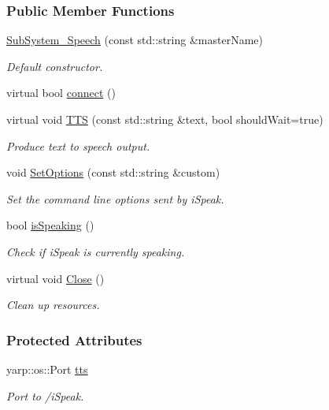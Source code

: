 \subsubsection*{Public Member Functions}
\begin{DoxyCompactItemize}
\item 
\hyperlink{group__icubclient__subsystems_a5a699b6d31d50fec18e5e63adecf5c96}{Sub\+System\+\_\+\+Speech} (const std\+::string \&master\+Name)
\begin{DoxyCompactList}\small\item\em Default constructor. \end{DoxyCompactList}\item 
virtual bool \hyperlink{group__icubclient__subsystems_abbf3a0069184f64f4999b0e94077b2db}{connect} ()
\item 
virtual void \hyperlink{group__icubclient__subsystems_aec30b053cc477248ac8c50e8b8d16c38}{T\+TS} (const std\+::string \&text, bool should\+Wait=true)
\begin{DoxyCompactList}\small\item\em Produce text to speech output. \end{DoxyCompactList}\item 
void \hyperlink{group__icubclient__subsystems_ae6d315e4436bdd157dd6427fa7274999}{Set\+Options} (const std\+::string \&custom)
\begin{DoxyCompactList}\small\item\em Set the command line options sent by i\+Speak. \end{DoxyCompactList}\item 
bool \hyperlink{group__icubclient__subsystems_acf4c51cc8ebb0373f65ede7f2f2155b6}{is\+Speaking} ()
\begin{DoxyCompactList}\small\item\em Check if i\+Speak is currently speaking. \end{DoxyCompactList}\item 
virtual void \hyperlink{group__icubclient__subsystems_a12a3920b40dbabaf9eb7d14d81c172da}{Close} ()
\begin{DoxyCompactList}\small\item\em Clean up resources. \end{DoxyCompactList}\end{DoxyCompactItemize}
\subsubsection*{Protected Attributes}
\begin{DoxyCompactItemize}
\item 
yarp\+::os\+::\+Port \hyperlink{group__icubclient__subsystems_a773a18382b36c671d74ab5caaeb873bc}{tts}
\begin{DoxyCompactList}\small\item\em Port to /i\+Speak. \end{DoxyCompactList}\end{DoxyCompactItemize}

